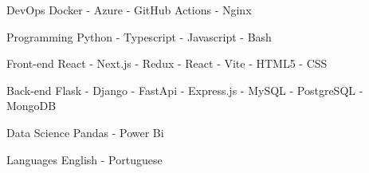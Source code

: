 

\begin{cvskills}

  \cvskill
    {DevOps} %
    {Docker - Azure - GitHub Actions - Nginx} %

  \cvskill
    {Programming} %
    {Python - Typescript - Javascript - Bash} %

  \cvskill
      {Front-end} %
      {React - Next.js - Redux - React - Vite - HTML5 - CSS} %

  \cvskill
    {Back-end} %
    {Flask - Django - FastApi - Express.js -  MySQL - PostgreSQL - MongoDB} %

  \cvskill
    {Data Science} %
    {Pandas - Power Bi} %

  \cvskill
    {Languages} %
    {English - Portuguese} %

\end{cvskills}
